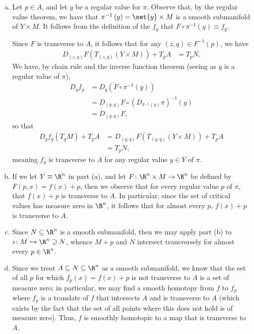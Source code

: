 \documentclass[10pt]{mypackage}
\begin{document}
\begin{solution}\hfill
  \begin{enumerate}[(a)]
    \item Let $p\in A$, and let $y$ be a regular value for $\pi$. Observe that, by the regular value theorem, we have that $\pi^{-1}\left( y \right) = \set{y}\times M$ is a smooth submanifold of $Y\times M$. It follows from the definition of the $f_y$ that $F\circ \pi^{-1}\left( y \right) \equiv f_y$.\newline

      Since $F$ is transverse to $A$, it follows that for any $\left( z,q \right)\in F^{-1}\left( p \right)$, we have
      \begin{align*}
        D_{(z,q)}F\left( T_{(z,q)}\left( Y\times M \right) \right) + T_pA &= T_pN.
      \end{align*}
      We have, by chain rule and the inverse function theorem (seeing as $y$ is a regular value of $\pi$),
      \begin{align*}
        D_qf_y &= D_q\left( F\circ\pi^{-1}(y) \right)\\
               &= D_{(y,q)}F\circ \left( D_{\pi^{-1}(y)}\pi \right)^{-1}(y)\\
               &= D_{(y,q)}F,
      \end{align*}
      so that
      \begin{align*}
        D_qf_y\left( T_{q}M \right) + T_pA &= D_{(y,q)}F\left( T_{(y,q)}\left( Y\times M \right) \right) + T_pA\\
                                           &= T_pN,
      \end{align*}
      meaning $f_y$ is transverse to $A$ for any regular value $y\in Y$ of $\pi$.
    \item If we let $Y \equiv \R^{n}$ in part (a), and let $F\colon \R^{n}\times M \rightarrow \R^{n}$ be defined by $F\left( p,x \right) = f(x) + p$, then we observe that for every regular value $p$ of $\pi$, that $f(x) + p$ is transverse to $A$. In particular, since the set of critical values has measure zero in $\R^{n}$, it follows that for almost every $p$, $f(x) + p$ is transverse to $A$.
    \item Since $N\subseteq \R^{n}$ is a smooth submanifold, then we may apply part (b) to $\iota\colon M\hookrightarrow \R^{n}\supseteq N$, whence $M+p$ and $N$ intersect transversely for almost every $p\in \R^{n}$.
    \item Since we treat $A\subseteq N\subseteq \R^{n}$ as a smooth submanifold, we know that the set of all $p$ for which $f_p(x) = f(x) + p$ is not transverse to $A$ is a set of measure zero; in particular, we may find a smooth homotopy from $f$ to $f_p$ where $f_p$ is a translate of $f$ that intersects $A$ and is transverse to $A$ (which exists by the fact that the set of all points where this does not hold is of measure zero). Thus, $f$ is smoothly homotopic to a map that is transverse to $A$.
  \end{enumerate}
\end{solution}
\end{document}
